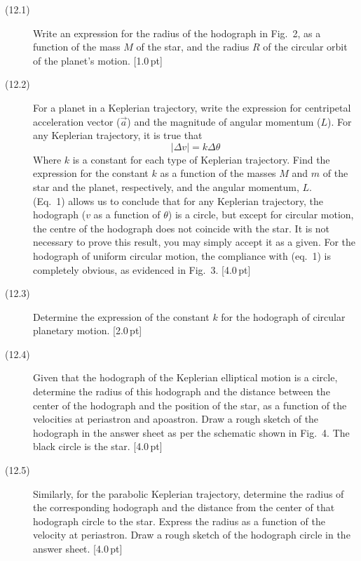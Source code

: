 \begin{description}
\item[(12.1)] Write an expression for the radius of the hodograph in Fig.~2,
  as a function of the mass $M$ of the star, and the radius $R$ of the
  circular orbit of the planet's motion. \hfill[1.0\,pt]
\item[(12.2)] For a planet in a Keplerian trajectory, write the expression for
  centripetal acceleration vector ($\vec{a}$) and the magnitude of angular
  momentum ($L$). For any Keplerian trajectory, it is true that
  \[ |\Delta v| = k\Delta\theta \tag{1} \]
  Where $k$ is a constant for each type of Keplerian trajectory. Find the
  expression for the constant $k$ as a function of the masses $M$ and $m$ of
  the star and the planet, respectively, and the angular momentum, $L$.\\
  (Eq.~1) allows us to conclude that for any Keplerian trajectory, the
  hodograph ($v$ as a function of $\theta$) is a circle, but except for
  circular motion, the centre of the hodograph does not coincide with the
  star. It is not necessary to prove this result, you may simply accept it as
  a given. For the hodograph of uniform circular motion, the compliance with
  (eq.~1) is completely obvious, as evidenced in Fig.~3. \hfill[4.0\,pt]


\item[(12.3)] Determine the expression of the constant $k$ for the hodograph
  of circular planetary motion. \hfill[2.0\,pt]
\item[(12.4)] Given that the hodograph of the Keplerian elliptical motion is a
  circle, determine the radius of this hodograph and the distance between the
  center of the hodograph and the position of the star, as a function of the
  velocities at periastron and apoastron. Draw a rough sketch of the hodograph
  in the answer sheet as per the schematic shown in Fig.~4. The black circle
  is the star. \hfill[4.0\,pt]


\item[(12.5)] Similarly, for the parabolic Keplerian trajectory, determine the
  radius of the corresponding hodograph and the distance from the center of
  that hodograph circle to the star. Express the radius as a function of the
  velocity at periastron. Draw a rough sketch of the hodograph circle in the
  answer sheet. \hfill[4.0\,pt]
\end{description}

